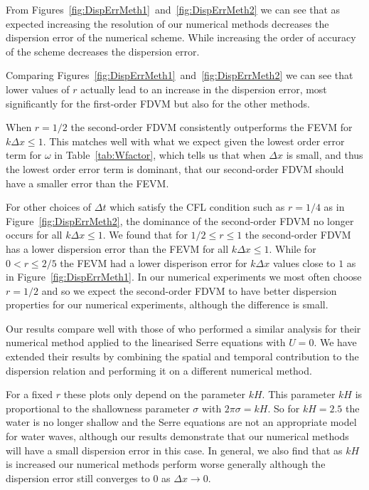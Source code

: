 From Figures~\ref{fig:DispErrMeth1}~and~\ref{fig:DispErrMeth2} we can see that as expected increasing the resolution of our numerical methods decreases the dispersion error of the numerical scheme. While increasing the order of accuracy of the scheme decreases the dispersion error. 

Comparing Figures~\ref{fig:DispErrMeth1}~and~\ref{fig:DispErrMeth2} we can see that lower values of $r$ actually lead to an increase in the dispersion error, most significantly for the first-order FDVM but also for the other methods. 

When $r = 1/2 $ the second-order FDVM consistently outperforms the FEVM for $k \Delta x \le 1$. This matches well with what we expect given the lowest order error term for $\omega$ in Table~\ref{tab:Wfactor}, which tells us that when $\Delta x$ is small, and thus the lowest order error term is dominant, that our second-order FDVM should have a smaller error than the FEVM. 

For other choices of $\Delta t$ which satisfy the CFL condition such as $r = 1/4$ as in Figure~\ref{fig:DispErrMeth2}, the dominance of the second-order FDVM no longer occurs for all $k \Delta x \le 1$. We found that for $1/2 \le r \le 1$ the second-order FDVM has a lower dispersion error than the FEVM for all $k \Delta x \le 1$. While for $ 0 < r \le 2/5 $ the FEVM had a lower disperison error for $k \Delta x$ values close to $1$ as in Figure~\ref{fig:DispErrMeth1}. In our numerical experiments we most often choose $r = 1/2$ and so we expect the second-order FDVM to have better dispersion properties for our numerical experiments, although the difference is small. 

Our results compare well with those of \cite{Filippini-etal-2016-381} who performed a similar analysis for their numerical method applied to the linearised Serre equations with $U=0$. We have extended their results by combining the spatial and temporal contribution to the dispersion relation and performing it on a different numerical method.

For a fixed $r$ these plots only depend on the parameter $kH$. This parameter $kH$ is proportional to the shallowness parameter $\sigma$ with $2 \pi \sigma = kH $. So for $kH=2.5$ the water is no longer shallow and the Serre equations are not an appropriate model for water waves, although our results demonstrate that our numerical methods will have a small dispersion error in this case. In general, we also find that as $kH$ is increased our numerical methods perform worse generally although the dispersion error still converges to $0$ as $\Delta x \rightarrow 0$. 


